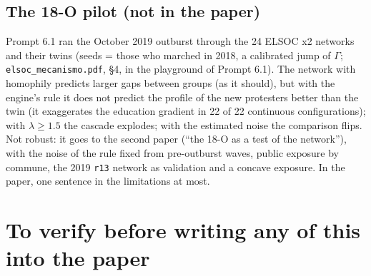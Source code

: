 \documentclass[11pt,a4paper]{article}
\newcommand{\code}[1]{\texttt{#1}}
\begin{document}
\subsection{The 18-O pilot (not in the paper)}
\label{sec:rule-18O}

Prompt 6.1 ran the October 2019 outburst through the 24 ELSOC x2 networks and their twins (seeds = those who
marched in 2018, a calibrated jump of $\Gamma$; \code{elsoc\_mecanismo.pdf}, \S4, in the playground of
Prompt 6.1). The network with homophily predicts larger gaps between groups (as it should), but with the engine's rule
it does not predict the profile of the new protesters better than the twin (it exaggerates the education
gradient in 22 of 22 continuous configurations); with $\lambda \ge 1.5$ the cascade explodes; with the
estimated noise the comparison flips. Not robust: it goes to the second paper (``the 18-O as a test of the
network''), with the noise of the rule fixed from pre-outburst waves, public exposure by commune, the 2019
\code{r13} network as validation and a concave exposure. In the paper, one sentence in the limitations at
most.


\section{To verify before writing any of this into the paper}
\label{sec:verify}
\end{document}
